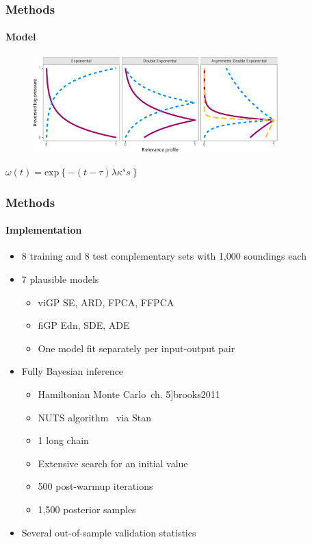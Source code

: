 \documentclass{snedecorbeamer}
\newcommand{\citep}[1]{}
\begin{document}
\begin{frame}[c]
  \frametitle{Methods}
  \framesubtitle{Model}

  \begin{figure}
    \centering
    \includegraphics[height=10em]{inc/mls_weight_profiles}
  \end{figure}

  \begin{center}
    $\omega(t) = \text{exp}\left\{-(t - \tau) \lambda \kappa^s s\right\}$\\
  \end{center}

  \blankfootnote{
    Space:
    $\omega(t): \mathcal{T} = [0, 1] \to (0, 1]$,
    $s = \text{sign}(t - \tau)$,
    $\tau > 0$,
    $\lambda > 0$,
    $\kappa > 0$ \\
    \hspace{3.25ex}
    Priors:
    $\indent\tau \sim \textsc{Beta}$,
    $\lambda \sim \textsc{N}^{+}$,
    $\log(\kappa) \sim \textsc{N}$
  }
\end{frame}

\begin{frame}
  \frametitle{Methods}
  \framesubtitle{Implementation}

  \begin{itemize}
  \item 8 training and 8 test complementary sets with 1,000 soundings each
  \item 7 plausible models
    \begin{itemize}
    \item viGP SE, ARD, FPCA, FFPCA
    \item fiGP Edn, SDE, ADE
    \item One model fit separately per input-output pair
    \end{itemize}
  \item Fully Bayesian inference
    \begin{itemize}
    \item Hamiltonian Monte Carlo~\citep[ch. 5]{brooks2011}
    \item NUTS algorithm~\citep{hoffman2014} via
      Stan~\citep{standevelopmentteam2021}
    \item 1 long chain~\citep{raftery1992}
    \item Extensive search for an initial value
    \item 500 post-warmup iterations
    \item 1,500 posterior samples
    \end{itemize}
  \item Several out-of-sample validation statistics
  \end{itemize}
\end{frame}
\end{document}
